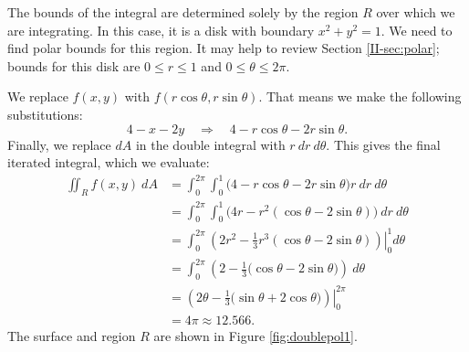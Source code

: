 {The bounds of the integral are determined solely by the region $R$ over which we are integrating. In this case, it is a disk with boundary $x^2+y^2=1$. We need to find polar bounds for this region. It may help to review Section \ref{II-sec:polar}; bounds for this disk are $0\leq r\leq 1$ and $0\leq \theta\leq 2\pi$.

We replace $f(x,y)$ with $f(r\cos\theta,r\sin\theta)$. That means we make the following substitutions:
\[
4-x-2y \quad \Rightarrow \quad 4-r\cos\theta-2r\sin\theta.
\]
Finally, we replace $dA$ in the double integral with $r\ dr\ d\theta$. This gives the final iterated integral, which we evaluate:
\begin{align*}
\iint_Rf(x,y)\ dA &= \int_0^{2\pi}\int_0^1\big(4-r\cos\theta-2r\sin\theta\big)r\ dr\ d\theta\\
						&= \int_0^{2\pi}\int_0^1\big(4r-r^2(\cos\theta-2\sin\theta)\big)\ dr\ d\theta\\
						&= \int_0^{2\pi}\left.\left(2r^2-\frac13r^3(\cos\theta-2\sin\theta)\right)\right|_0^1d\theta\\
						&= \int_0^{2\pi} \left(2-\frac13\big(\cos\theta-2\sin\theta\big)\right)\ d\theta\\
						&= \left.\left(2\theta -\frac13\big(\sin\theta+2\cos\theta\big)\right)\right|_0^{2\pi} \\
						&= 4\pi \approx 12.566.
\end{align*}
The surface and region $R$ are shown in Figure \ref{fig:doublepol1}.
}\\

